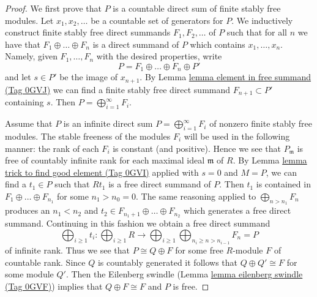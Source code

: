 \documentclass{amsart}
\theoremstyle{plain}
\theoremstyle{definition}
\theoremstyle{remark}
\numberwithin{equation}{subsection}
\begin{document}
\begin{proof}
We first prove that $P$ is a countable direct sum of finite stably
free modules. Let $x_1, x_2, \ldots$ be a countable set of generators for $P$.
We inductively construct finite stably free direct summands
$F_1, F_2, \ldots$ of $P$ such that for all $n$ we have
that $F_1 \oplus \ldots \oplus F_n$ is a direct summand of $P$
which contains $x_1, \ldots, x_n$. Namely, given $F_1, \ldots, F_n$
with the desired properties, write
$$
P = F_1 \oplus \ldots \oplus F_n \oplus P'
$$
and let $s \in P'$ be the image of $x_{n + 1}$.
By Lemma \href{https://stacks.math.columbia.edu/tag/0GVJ}{lemma element in free summand (Tag 0GVJ)}
we can find a finite stably free direct summand $F_{n + 1} \subset P'$
containing $s$. Then $P = \bigoplus_{i = 1}^{\infty} F_i$.

\medskip\noindent
Assume that $P$ is an infinite direct sum
$P = \bigoplus_{i = 1}^{\infty} F_i$ of nonzero
finite stably free modules. The stable freeness
of the modules $F_i$ will be used in the following
manner: the rank of each $F_i$ is constant (and positive). Hence
we see that $P_\mathfrak m$ is free
of countably infinite rank for each maximal ideal
$\mathfrak m$ of $R$. By Lemma \href{https://stacks.math.columbia.edu/tag/0GVI}{lemma trick to find good element (Tag 0GVI)}
applied with $s = 0$ and $M = P$, we can find
a $t_1 \in P$ such that $Rt_1$ is a free direct summand of $P$.
Then $t_1$ is contained in $F_1 \oplus \ldots \oplus F_{n_1}$
for some $n_1 > n_0 = 0$.
The same reasoning applied to $\bigoplus_{n > n_1} F_n$
produces an $n_1 < n_2$ and $t_2 \in F_{n_1 + 1} \oplus \ldots \oplus F_{n_2}$
which generates a free direct summand.
Continuing in this fashion we obtain a free direct summand
$$
\bigoplus\nolimits_{i \geq 1} t_i :
\bigoplus\nolimits_{i \geq 1} R
\longrightarrow
\bigoplus\nolimits_{i \geq 1}
\bigoplus\nolimits_{n_i \geq n > n_{i - 1}} F_n = P
$$
of infinite rank. Thus we see that $P \cong Q \oplus F$ for some free
$R$-module $F$ of countable rank. Since $Q$ is countably
generated it follows that $Q \oplus Q' \cong F$ for
some module $Q'$. Then the Eilenberg swindle
(Lemma \href{https://stacks.math.columbia.edu/tag/0GVF}{lemma eilenberg swindle (Tag 0GVF)}) implies that
$Q \oplus F \cong F$ and $P$ is free.
\end{proof}
\end{document}
